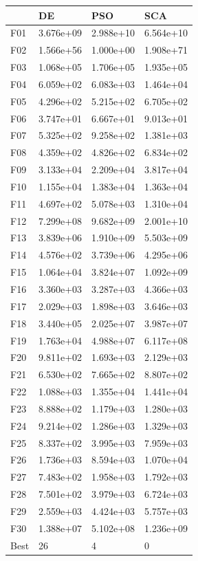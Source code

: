 \begin{tabular}{llll}
\toprule
{} &         DE &        PSO &        SCA \\
\midrule
F01  &  3.676e+09 &  2.988e+10 &  6.564e+10 \\
F02  &  1.566e+56 &  1.000e+00 &  1.908e+71 \\
F03  &  1.068e+05 &  1.706e+05 &  1.935e+05 \\
F04  &  6.059e+02 &  6.083e+03 &  1.464e+04 \\
F05  &  4.296e+02 &  5.215e+02 &  6.705e+02 \\
F06  &  3.747e+01 &  6.667e+01 &  9.013e+01 \\
F07  &  5.325e+02 &  9.258e+02 &  1.381e+03 \\
F08  &  4.359e+02 &  4.826e+02 &  6.834e+02 \\
F09  &  3.133e+04 &  2.209e+04 &  3.817e+04 \\
F10  &  1.155e+04 &  1.383e+04 &  1.363e+04 \\
F11  &  4.697e+02 &  5.078e+03 &  1.310e+04 \\
F12  &  7.299e+08 &  9.682e+09 &  2.001e+10 \\
F13  &  3.839e+06 &  1.910e+09 &  5.503e+09 \\
F14  &  4.576e+02 &  3.739e+06 &  4.295e+06 \\
F15  &  1.064e+04 &  3.824e+07 &  1.092e+09 \\
F16  &  3.360e+03 &  3.287e+03 &  4.366e+03 \\
F17  &  2.029e+03 &  1.898e+03 &  3.646e+03 \\
F18  &  3.440e+05 &  2.025e+07 &  3.987e+07 \\
F19  &  1.763e+04 &  4.988e+07 &  6.117e+08 \\
F20  &  9.811e+02 &  1.693e+03 &  2.129e+03 \\
F21  &  6.530e+02 &  7.665e+02 &  8.807e+02 \\
F22  &  1.088e+03 &  1.355e+04 &  1.441e+04 \\
F23  &  8.888e+02 &  1.179e+03 &  1.280e+03 \\
F24  &  9.214e+02 &  1.286e+03 &  1.329e+03 \\
F25  &  8.337e+02 &  3.995e+03 &  7.959e+03 \\
F26  &  1.736e+03 &  8.594e+03 &  1.070e+04 \\
F27  &  7.483e+02 &  1.958e+03 &  1.792e+03 \\
F28  &  7.501e+02 &  3.979e+03 &  6.724e+03 \\
F29  &  2.559e+03 &  4.424e+03 &  5.757e+03 \\
F30  &  1.388e+07 &  5.102e+08 &  1.236e+09 \\
Best &         26 &          4 &          0 \\
\bottomrule
\end{tabular}
